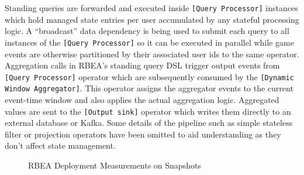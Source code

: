 Standing queries are forwarded and executed inside \texttt{[Query Processor]} instances which hold managed state entries per user accumulated by any stateful processing logic. A ``broadcast'' data dependency is being used to submit each query to all instances of the \texttt{[Query Processor]} so it can be executed in parallel while game events are otherwise partitioned by their associated user ids to the same operator. Aggregation calls in RBEA's standing query DSL trigger output events from \texttt{[Query Processor]} operator which are subsequently consumed by the \texttt{[Dynamic Window Aggregator]}. This operator assigns the aggregator events to the current event-time window and also applies the actual aggregation logic. Aggregated values are sent to the \texttt{[Output sink]} operator which writes them directly to an external database or Kafka. Some details of the pipeline such as simple stateless filter or projection operators have been omitted to aid understanding as they don't affect state management.


\begin{figure}[htp]
\centering
{}\medskip
{}\medskip
{}
\vspace*{-0.25in}
\caption{RBEA Deployment Measurements on Snapshots }
\label{fig:kingmetrics}
\vspace*{-2mm}
\end{figure}

